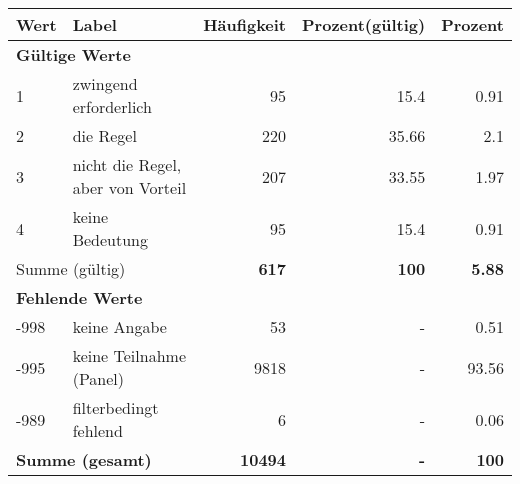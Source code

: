      \begin{longtable}{lXrrr}
     \toprule
     \textbf{Wert} & \textbf{Label} & \textbf{Häufigkeit} & \textbf{Prozent(gültig)} & \textbf{Prozent} \\
     \endhead
     \midrule
     \multicolumn{5}{l}{\textbf{Gültige Werte}}\\

     1 &
     \multicolumn{1}{X}{ zwingend erforderlich   } &


       \num{95} &
       \num[round-mode=places,round-precision=2]{15.4} &
         \num[round-mode=places,round-precision=2]{0.91} \\

     2 &
     \multicolumn{1}{X}{ die Regel   } &


       \num{220} &
       \num[round-mode=places,round-precision=2]{35.66} &
         \num[round-mode=places,round-precision=2]{2.1} \\

     3 &
     \multicolumn{1}{X}{ nicht die Regel, aber von Vorteil   } &


       \num{207} &
       \num[round-mode=places,round-precision=2]{33.55} &
         \num[round-mode=places,round-precision=2]{1.97} \\

     4 &
     \multicolumn{1}{X}{ keine Bedeutung   } &


       \num{95} &
       \num[round-mode=places,round-precision=2]{15.4} &
         \num[round-mode=places,round-precision=2]{0.91} \\
     \midrule
     \multicolumn{2}{l}{Summe (gültig)} &
       \textbf{\num{617}} &
     \textbf{\num{100}} &
       \textbf{\num[round-mode=places,round-precision=2]{5.88}} \\
     \multicolumn{5}{l}{\textbf{Fehlende Werte}}\\
       -998 &
       keine Angabe &
         \num{53} &
        - &
         \num[round-mode=places,round-precision=2]{0.51} \\
       -995 &
       keine Teilnahme (Panel) &
         \num{9818} &
        - &
         \num[round-mode=places,round-precision=2]{93.56} \\
       -989 &
       filterbedingt fehlend &
         \num{6} &
        - &
         \num[round-mode=places,round-precision=2]{0.06} \\
     \midrule
     \multicolumn{2}{l}{\textbf{Summe (gesamt)}} &
          \textbf{\num{10494}} &
        \textbf{-} &
        \textbf{\num{100}} \\
     \bottomrule
     \end{longtable}
     
